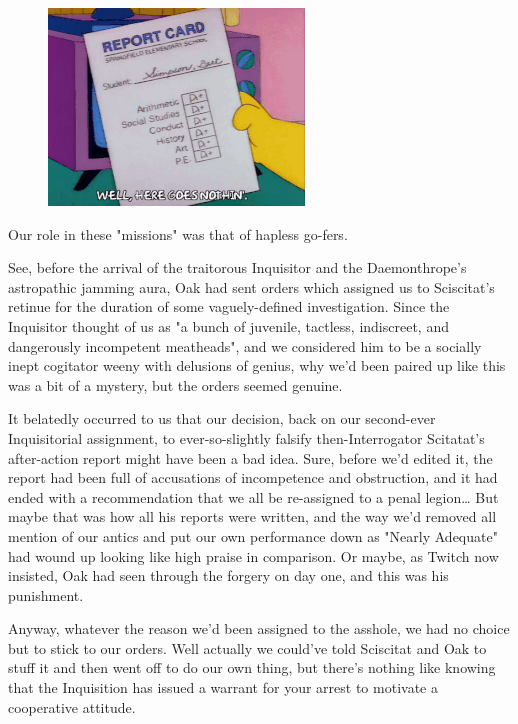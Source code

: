 \begin{figure}
	\begin{center}
		\includegraphics[width=\figwidth]{pics/17/7.png}
	\end{center}
\end{figure}
Our role in these "missions" was that of hapless go-fers. 


See, before the arrival of the traitorous Inquisitor and the Daemonthrope's astropathic jamming aura, Oak had sent orders which assigned us to Sciscitat's retinue for the duration of some vaguely-defined investigation. 
Since the Inquisitor thought of us as "a bunch of juvenile, tactless, indiscreet, and dangerously incompetent meatheads", and we considered him to be a socially inept cogitator weeny with delusions of genius, why we'd been paired up like this was a bit of a mystery, but the orders seemed genuine.

It belatedly occurred to us that our decision, back on our second-ever Inquisitorial assignment, to ever-so-slightly falsify then-Interrogator Scitatat's after-action report might have been a bad idea. 
Sure, before we'd edited it, the report had been full of accusations of incompetence and obstruction, and it had ended with a recommendation that we all be re-assigned to a penal legion… But maybe that was how all his reports were written, and the way we'd removed all mention of our antics and put our own performance down as "Nearly Adequate" had wound up looking like high praise in comparison. 
Or maybe, as Twitch now insisted, Oak had seen through the forgery on day one, and this was his punishment.

Anyway, whatever the reason we'd been assigned to the asshole, we had no choice but to stick to our orders. 
Well actually we could've told Sciscitat and Oak to stuff it and then went off to do our own thing, but there's nothing like knowing that the Inquisition has issued a warrant for your arrest to motivate a cooperative attitude.

